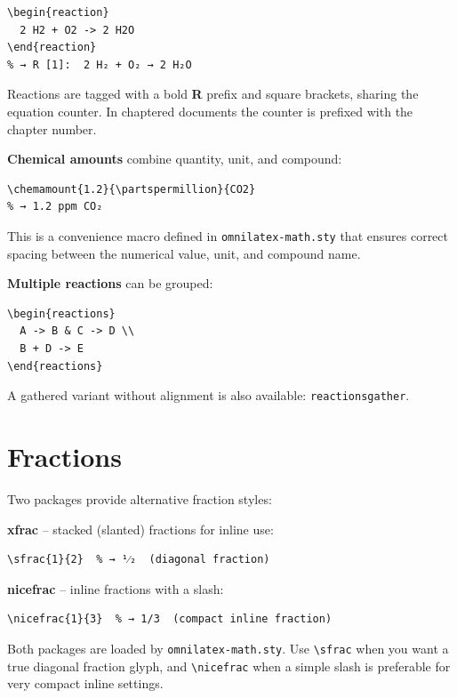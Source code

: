 \begin{verbatim}
\begin{reaction}
  2 H2 + O2 -> 2 H2O
\end{reaction}
% → R [1]:  2 H₂ + O₂ → 2 H₂O
\end{verbatim}

Reactions are tagged with a bold \textbf{R} prefix and square brackets,
sharing the equation counter.  In chaptered documents the counter is
prefixed with the chapter number.

\textbf{Chemical amounts} combine quantity, unit, and compound:

\begin{verbatim}
\chemamount{1.2}{\partspermillion}{CO2}
% → 1.2 ppm CO₂
\end{verbatim}

This is a convenience macro defined in \texttt{omnilatex-math.sty} that
ensures correct spacing between the numerical value, unit, and compound
name.

\textbf{Multiple reactions} can be grouped:

\begin{verbatim}
\begin{reactions}
  A -> B & C -> D \\
  B + D -> E
\end{reactions}
\end{verbatim}

A gathered variant without alignment is also available:
\texttt{reactionsgather}.

\section{Fractions}

Two packages provide alternative fraction styles:

\textbf{xfrac} -- stacked (slanted) fractions for inline use:

\begin{verbatim}
\sfrac{1}{2}  % → ¹⁄₂  (diagonal fraction)
\end{verbatim}

\textbf{nicefrac} -- inline fractions with a slash:

\begin{verbatim}
\nicefrac{1}{3}  % → 1/3  (compact inline fraction)
\end{verbatim}

Both packages are loaded by \texttt{omnilatex-math.sty}.  Use
\texttt{\textbackslash sfrac} when you want a true diagonal fraction
 glyph, and \texttt{\textbackslash nicefrac} when a simple slash is
 preferable for very compact inline settings.
